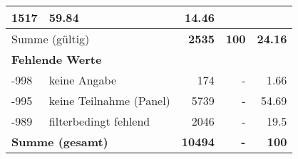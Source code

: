 \begin{longtable}{lXrrr}
       \num{1517} &
       \num[round-mode=places,round-precision=2]{59,84} &
         \num[round-mode=places,round-precision=2]{14,46} \\
     \midrule
     \multicolumn{2}{l}{Summe (gültig)} &
       \textbf{\num{2535}} &
     \textbf{100} &
       \textbf{\num[round-mode=places,round-precision=2]{24,16}} \\
     \multicolumn{5}{l}{\textbf{Fehlende Werte}}\\
       -998 &
       keine Angabe &
         \num{174} &
        - &
         \num[round-mode=places,round-precision=2]{1,66} \\
       -995 &
       keine Teilnahme (Panel) &
         \num{5739} &
        - &
         \num[round-mode=places,round-precision=2]{54,69} \\
       -989 &
       filterbedingt fehlend &
         \num{2046} &
        - &
         \num[round-mode=places,round-precision=2]{19,5} \\
     \midrule
     \multicolumn{2}{l}{\textbf{Summe (gesamt)}} &
          \textbf{\num{10494}} &
        \textbf{-} &
        \textbf{100} \\
     \bottomrule
     \end{longtable}
     
